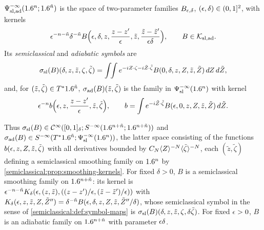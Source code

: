 \begin{definition}\label{semiclassical:def:sl-ad}
  $\Psi^{-\infty}_{\mathrm{sl,ad}}(1.6^n;1.6^{\tilde n})$ is the space of two-parameter families $B_{\epsilon,\delta}$,
  $(\epsilon,\delta)\in(0,1]^2$, with kernels
  \begin{equation*}
    \epsilon^{-n-\tilde n}\delta^{-\tilde n}B\Bigl(\epsilon,\delta,z,\frac{z-z'}{\epsilon},\tilde z,\frac{\tilde z-\tilde z'}{\epsilon\delta}\Bigr),
    \qquad B\in\mathcal K_{\mathrm{sl,ad}}.
  \end{equation*}
  Its \emph{semiclassical} and \emph{adiabatic symbols} are
  \begin{equation*}
    \sigma_{\mathrm{sl}}(B)(\delta,z,\tilde z,\zeta,\tilde\zeta)=\int\!\!\int e^{-iZ\cdot\zeta-i\tilde Z\cdot\tilde\zeta}
    B(0,\delta,z,Z,\tilde z,\tilde Z)\,dZ\,d\tilde Z,
  \end{equation*}
  and, for $(\tilde z,\tilde\zeta)\in T^*1.6^{\tilde n}$, $\sigma_{\mathrm{ad}}(B)(\tilde z,\tilde\zeta)$ is the family in
  $\Psi^{-\infty}_{\mathrm{sl}}(1.6^n)$ with kernel
  \begin{equation*}
    \epsilon^{-n}b\Bigl(\epsilon,z,\frac{z-z'}{\epsilon},\tilde z,\tilde\zeta\Bigr),\qquad
    b=\int e^{-i\tilde Z\cdot\tilde\zeta}B(\epsilon,0,z,Z,\tilde z,\tilde Z)\,d\tilde Z .
  \end{equation*}
\end{definition}

Thus $\sigma_{\mathrm{sl}}(B)\in\mathcal{C}^\infty([0,1]_\delta;S^{-\infty}(1.6^{n+\tilde n};1.6^{n+\tilde n}))$ and
$\sigma_{\mathrm{ad}}(B)\in S^{-\infty}(T^*1.6^{\tilde n};\Psi^{-\infty}_{\mathrm{sl}}(1.6^n))$, the latter space
consisting of the functions $b(\epsilon,z,Z,\tilde z,\tilde\zeta)$ with all derivatives
bounded by $C_N\langle Z\rangle^{-N}\langle \tilde\zeta\rangle^{-N}$, each $(\tilde z,\tilde\zeta)$ defining a semiclassical
smoothing family on $1.6^n$ by \cref{semiclassical:prop:smoothing-kernels}. For fixed
$\delta>0$, $B$ is a semiclassical smoothing family on $1.6^{n+\tilde n}$: its kernel is
$\epsilon^{-n-\tilde n}K_\delta(\epsilon,(z,\tilde z),((z-z')/\epsilon,(\tilde z-\tilde z')/\epsilon))$ with
$K_\delta(\epsilon,z,\tilde z,Z,\tilde Z'')=\delta^{-\tilde n}B(\epsilon,\delta,z,Z,\tilde z,\tilde Z''/\delta)$, whose semiclassical
symbol in the sense of \cref{semiclassical:def:symbol-maps} is
$\sigma_{\mathrm{sl}}(B)(\delta,z,\tilde z,\zeta,\delta\tilde\zeta)$. For fixed $\epsilon>0$, $B$ is an adiabatic family on
$1.6^{n+\tilde n}$ with parameter $\epsilon\delta$.

